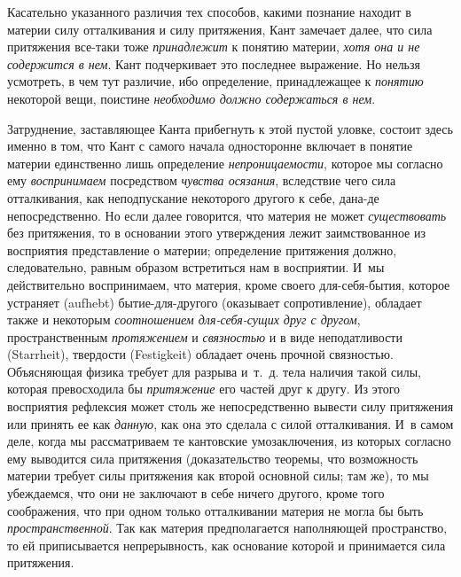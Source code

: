 Касательно указанного различия тех способов, какими познание находит в
материи силу отталкивания и силу притяжения, Кант замечает далее, что сила
притяжения все-таки тоже {\em принадлежит} к понятию
материи, {\em хотя она и не содержится в нем}. Кант
подчеркивает это последнее выражение. Но нельзя усмотреть, в чем тут
различие, ибо определение, принадлежащее к
{\em понятию} некоторой вещи, поистине
{\em необходимо должно содержаться в нем}.

Затруднение, заставляющее Канта прибегнуть к этой пустой уловке, состоит
здесь именно в том, что Кант с самого начала односторонне включает в
понятие материи единственно лишь определение
{\em непроницаемости}, которое мы согласно ему
{\em воспринимаем} посредством
{\em чувства осязания}, вследствие чего сила
отталкивания, как неподпускание некоторого другого к себе, дана-де
непосредственно. Но если далее говорится, что материя не может
{\em существовать} без притяжения, то в основании этого
утверждения лежит заимствованное из восприятия представление о материи;
определение притяжения должно, следовательно, равным образом встретиться
нам в восприятии. И~мы действительно воспринимаем, что материя, кроме
своего для-себя-бытия, которое устраняет (aufhebt) бытие-для-другого
(оказывает сопротивление), обладает также и некоторым
{\em соотношением для-себя-сущих друг с другом},
пространственным {\em протяжением} и
{\em связностью} и в виде неподатливости (Starrheit),
твердости (Festigkeit) обладает очень прочной связностью. Объясняющая
физика требует для разрыва и~т.~д. тела наличия такой силы, которая
превосходила бы {\em притяжение} его частей друг к
другу. Из этого восприятия рефлексия может столь же непосредственно вывести
силу притяжения или принять ее как {\em данную}, как
она это сделала с силой отталкивания. И~в самом деле, когда мы
рассматриваем те кантовские умозаключения, из которых согласно ему
выводится сила притяжения (доказательство теоремы, что возможность материи
требует силы притяжения как второй основной силы; там же), то мы
убеждаемся, что они не заключают в себе ничего другого, кроме того
соображения, что при одном только отталкивании материя не могла бы быть
{\em пространственной}. Так как материя предполагается
наполняющей пространство, то ей приписывается непрерывность, как основание
которой и принимается сила притяжения.

